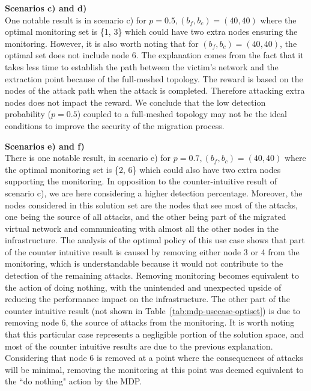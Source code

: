 \textbf{Scenarios c) and d)\\}
One notable result is in scenario c) for $p=0.5,  (b_f,b_c) = (40,40)$ where the optimal monitoring set is \{1, 3\} which could have two extra nodes ensuring the monitoring. However, it is also worth noting that for $(b_f,b_c)=(40,40)$, the optimal set does not include node 6. The explanation comes from the fact that it takes less time to establish the path between the victim's network and the extraction point because of the full-meshed topology. The reward is based on the nodes of the attack path when the attack is completed. Therefore attacking extra nodes does not impact the reward. We conclude that the low detection probability ($p=0.5$) coupled to a full-meshed topology may not be the ideal conditions to improve the security of the migration process.


\textbf{Scenarios e) and f)}\\
There is one  notable result, in scenario e) for $p=0.7,  (b_f,b_c) = (40,40)$ where the optimal monitoring set is \{2, 6\} which could also have two extra nodes supporting the monitoring. In opposition to the counter-intuitive result of scenario c), we are here considering a higher detection percentage. Moreover, the nodes considered in this solution set are the nodes that see most of the attacks, one being the source of all attacks, and the other being part of the migrated virtual network and communicating with almost all the other nodes in the infrastructure. The analysis of the optimal policy of this use case shows that part of the counter intuitive result is caused by removing either node 3 or 4 from the monitoring, which is understandable because it would not contribute to the detection of the remaining attacks. Removing monitoring becomes equivalent to the action of doing nothing, with the unintended and unexpected upside of reducing the performance impact on the infrastructure.
The other part of the counter intuitive result (not shown in Table~\ref{tab:mdp-usecase-optiset}) is due to removing node 6, the source of attacks from the monitoring. It is worth noting that this particular case represents a negligible portion of the solution space, and most of the counter intuitive results are due to the previous explanation. Considering that node 6 is removed at a point where the consequences of attacks will be minimal, removing the monitoring at this point was deemed equivalent to the ``do nothing" action by the MDP.


